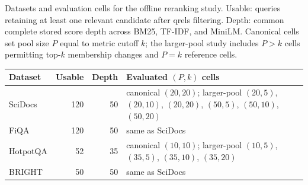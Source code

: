 \begin{supplementtable}
  \caption{Datasets and evaluation cells for the offline reranking study.
    Usable: queries retaining at least one relevant candidate after qrels
    filtering. Depth: common complete stored score depth across BM25,
    TF-IDF, and MiniLM. Canonical cells set pool size $P$ equal to metric
    cutoff $k$; the larger-pool study includes $P>k$ cells permitting top-$k$ membership changes and $P=k$ reference cells.}
  \label{tab:setup}
  \sncstable
  \begin{tabularx}{\linewidth}{@{}lrrY@{}}
    \toprule
    Dataset & Usable & Depth & Evaluated $(P,k)$ cells \\
    \midrule
    SciDocs & 120 & 50 & canonical $(20,20)$; larger-pool $(20,5)$,
      $(20,10)$, $(20,20)$, $(50,5)$, $(50,10)$, $(50,20)$ \\
    \addlinespace
    FiQA & 120 & 50 & same as SciDocs \\
    \addlinespace
    HotpotQA & 52 & 35 & canonical $(10,10)$; larger-pool $(10,5)$,
      $(35,5)$, $(35,10)$, $(35,20)$ \\
    \addlinespace
    BRIGHT & 50 & 50 & same as SciDocs \\
    \bottomrule
  \end{tabularx}
\end{supplementtable}